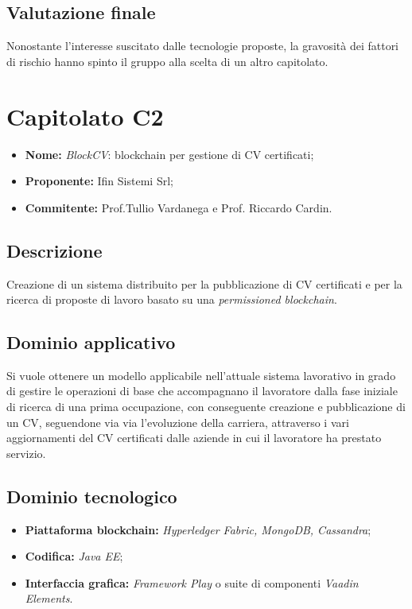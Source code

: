 \documentclass[openany,12pt,a4paper]{report}
\begin{document}
	\subsection{Valutazione finale}
	
	Nonostante l'interesse suscitato dalle tecnologie proposte, la gravosità dei fattori di rischio hanno spinto il gruppo alla scelta di un altro capitolato.
	
	
	\section{Capitolato C2}
	
	\begin{itemize}
		\item \textbf{Nome:} \textit{BlockCV}: blockchain per gestione di CV certificati;
		\item \textbf{Proponente:} Ifin Sistemi Srl;
		\item \textbf{Commitente:} Prof.Tullio Vardanega e Prof. Riccardo Cardin.
	\end{itemize}
	
	\subsection{Descrizione}
	
	Creazione di un sistema distribuito per la pubblicazione di CV certificati e per la ricerca di proposte di lavoro basato su una \textit{permissioned blockchain}.
	
	\subsection{Dominio applicativo}
	
	Si vuole ottenere un modello applicabile nell'attuale sistema lavorativo in grado di gestire le operazioni di base che accompagnano il lavoratore dalla fase iniziale di ricerca di una prima occupazione, con conseguente creazione e pubblicazione di un CV, seguendone via via l’evoluzione della carriera, attraverso i vari aggiornamenti del CV certificati dalle aziende in cui il lavoratore ha prestato servizio.
	
	\subsection{Dominio tecnologico}
	
	\begin{itemize}
		\item \textbf{Piattaforma blockchain:} \textit{Hyperledger Fabric, MongoDB, Cassandra};
		
		\item \textbf{Codifica:} \textit{Java EE};
		
		\item \textbf{Interfaccia grafica:} \textit{Framework Play} o suite di componenti \textit{Vaadin Elements}.
	\end{itemize}
	
\end{document}
